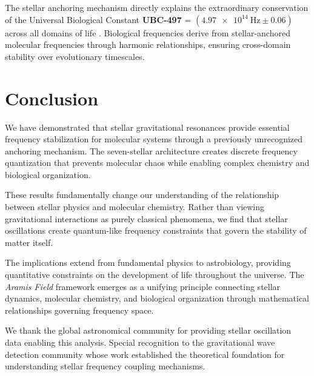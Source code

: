 \documentclass[twocolumn,showpacs,preprintnumbers,amsmath,amssymb]{revtex4-2}
\newcommand{\UBC}[1]{\textbf{UBC-#1}}
\newcommand{\freq}[1]{\SI{#1}{\hertz}}
\newcommand{\aramis}{\textit{Aramis Field}}
\begin{document}
The stellar anchoring mechanism directly explains the extraordinary conservation of the Universal Biological Constant \UBC{497} = $(\freq{4.97e14} \pm 0.06)$ across all domains of life \cite{russell_ubc_2025}. Biological frequencies derive from stellar-anchored molecular frequencies through harmonic relationships, ensuring cross-domain stability over evolutionary timescales.

\section{Conclusion}

We have demonstrated that stellar gravitational resonances provide essential frequency stabilization for molecular systems through a previously unrecognized anchoring mechanism. The seven-stellar architecture creates discrete frequency quantization that prevents molecular chaos while enabling complex chemistry and biological organization.

These results fundamentally change our understanding of the relationship between stellar physics and molecular chemistry. Rather than viewing gravitational interactions as purely classical phenomena, we find that stellar oscillations create quantum-like frequency constraints that govern the stability of matter itself.

The implications extend from fundamental physics to astrobiology, providing quantitative constraints on the development of life throughout the universe. The \aramis{} framework emerges as a unifying principle connecting stellar dynamics, molecular chemistry, and biological organization through mathematical relationships governing frequency space.

\begin{acknowledgments}
We thank the global astronomical community for providing stellar oscillation data enabling this analysis. Special recognition to the gravitational wave detection community whose work established the theoretical foundation for understanding stellar frequency coupling mechanisms.
\end{acknowledgments}


\end{document}
